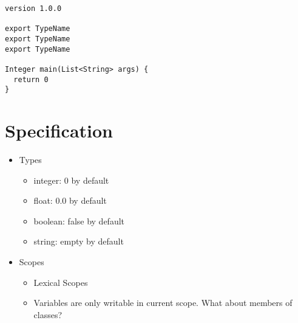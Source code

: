 \documentclass[a4paper,12pt]{article}
\begin{document}
\begin{verbatim}
version 1.0.0

export TypeName
export TypeName
export TypeName

Integer main(List<String> args) {
  return 0
}
\end{verbatim}

\section*{Specification}
\begin{itemize}
	\item Types
  	\begin{itemize}
  		\item integer: 0 by default
  		\item float: 0.0 by default
  		\item boolean: false by default
  		\item string: empty by default
  	\end{itemize} 
  	\item Scopes
  	\begin{itemize}
  		\item Lexical Scopes
  		\item Variables are only writable in current scope. What about members of classes?
  	\end{itemize}
\end{itemize}
\end{document}
